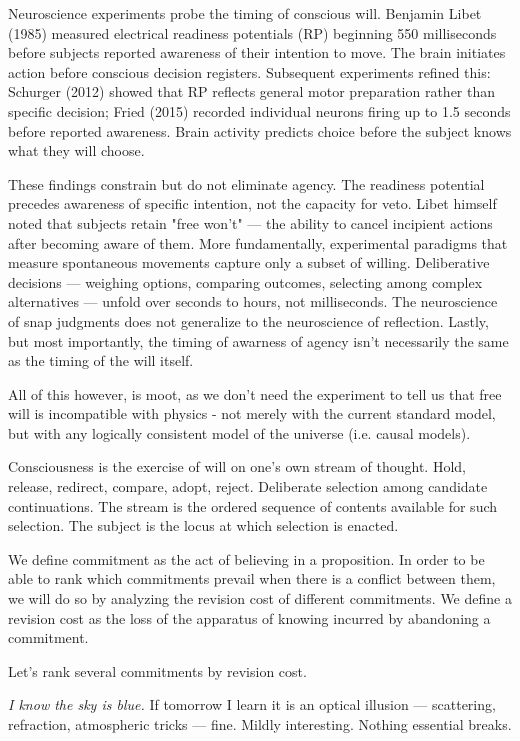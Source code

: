 Neuroscience experiments probe the timing of conscious will. Benjamin Libet (1985) measured electrical readiness potentials (RP) beginning 550 milliseconds before subjects reported awareness of their intention to move. The brain initiates action before conscious decision registers. Subsequent experiments refined this: Schurger (2012) showed that RP reflects general motor preparation rather than specific decision; Fried (2015) recorded individual neurons firing up to 1.5 seconds before reported awareness. Brain activity predicts choice before the subject knows what they will choose.

These findings constrain but do not eliminate agency. The readiness potential precedes awareness of specific intention, not the capacity for veto. Libet himself noted that subjects retain "free won't" — the ability to cancel incipient actions after becoming aware of them. More fundamentally, experimental paradigms that measure spontaneous movements capture only a subset of willing. Deliberative decisions — weighing options, comparing outcomes, selecting among complex alternatives — unfold over seconds to hours, not milliseconds. The neuroscience of snap judgments does not generalize to the neuroscience of reflection. Lastly, but most importantly, the timing of awarness of agency isn't necessarily the same as the timing of the will itself. 

All of this however, is moot, as we don't need the experiment to tell us that free will is incompatible with physics - not merely with the current standard model, but with any logically consistent model of the universe (i.e. causal models).

Consciousness is the exercise of will on one's own stream of thought. Hold, release, redirect, compare, adopt, reject. Deliberate selection among candidate continuations. The stream is the ordered sequence of contents available for such selection. The subject is the locus at which selection is enacted.

We define commitment as the act of believing in a proposition. In order to be able to rank which commitments prevail when there is a conflict between them, we will do so by analyzing the revision cost of different commitments. We define a revision cost as the loss of the apparatus of knowing incurred by abandoning a commitment.

Let's rank several commitments by revision cost.

\medskip

\textit{I know the sky is blue.} If tomorrow I learn it is an optical illusion — scattering, refraction, atmospheric tricks — fine. Mildly interesting. Nothing essential breaks.

